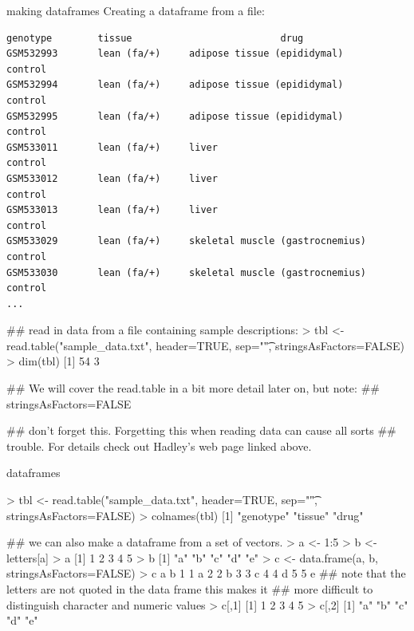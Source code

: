\documentclass[pdf]{beamer}
\begin{document}
\begin{frame}[fragile]{making dataframes}
  Creating a dataframe from a file:
  \begin{Verbatim}[fontsize=\tiny]
                genotype        tissue                          drug
GSM532993       lean (fa/+)     adipose tissue (epididymal)     control
GSM532994       lean (fa/+)     adipose tissue (epididymal)     control
GSM532995       lean (fa/+)     adipose tissue (epididymal)     control
GSM533011       lean (fa/+)     liver                           control
GSM533012       lean (fa/+)     liver                           control
GSM533013       lean (fa/+)     liver                           control
GSM533029       lean (fa/+)     skeletal muscle (gastrocnemius) control
GSM533030       lean (fa/+)     skeletal muscle (gastrocnemius) control
...
  \end{Verbatim}

  \begin{rcode}
    ## read in data from a file containing sample descriptions:
    > tbl <- read.table("sample_data.txt", header=TRUE, sep="\t", stringsAsFactors=FALSE)
    > dim(tbl)
    [1] 54  3
    
    ## We will cover the read.table in a bit more detail later on, but note:
    ## stringsAsFactors=FALSE
    
    ## don't forget this. Forgetting this when reading data can cause all sorts
    ## trouble. For details check out Hadley's web page linked above.
    \end{rcode}

\end{frame}

\begin{frame}[fragile]{dataframes}

  \begin{rcode}
    > tbl <- read.table("sample_data.txt", header=TRUE, sep="\t", stringsAsFactors=FALSE)
    > colnames(tbl)
    [1] "genotype" "tissue"   "drug"    

    ## we can also make a dataframe from a set of vectors.
    > a <- 1:5
    > b <- letters[a]
    > a
    [1] 1 2 3 4 5
    > b
    [1] "a" "b" "c" "d" "e"
    > c <- data.frame(a, b, stringsAsFactors=FALSE)
    > c
      a b
    1 1 a
    2 2 b
    3 3 c
    4 4 d
    5 5 e
    ## note that the letters are not quoted in the data frame this makes it
    ## more difficult to distinguish character and numeric values
    > c[,1]                                                                                                                
    [1] 1 2 3 4 5                                                                                                          
    > c[,2]
    [1] "a" "b" "c" "d" "e"                                                                                                
  \end{rcode}
\end{frame}
\end{document}
